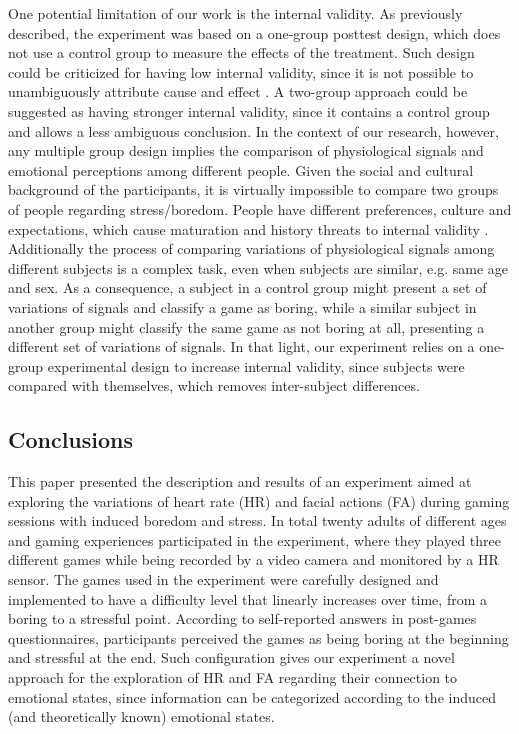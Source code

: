 One potential limitation of our work is the internal validity. As previously described, the experiment was based on a one-group posttest design, which does not use a control group to measure the effects of the treatment. Such design could be criticized for having low internal validity, since it is not possible to unambiguously attribute cause and effect \parencite{kirk1982experimental}. A two-group approach could be suggested as having stronger internal validity, since it contains a control group and allows a less ambiguous conclusion. In the context of our research, however, any multiple group design implies the comparison of physiological signals and emotional perceptions among different people. Given the social and cultural background of the participants, it is virtually impossible to compare two groups of people regarding stress/boredom. People have different preferences, culture and expectations, which cause maturation and history threats to internal validity \parencite{trochim2001research}. Additionally the process of comparing variations of physiological signals among different subjects is a complex task, even when subjects are similar, e.g. same age and sex. As a consequence, a subject in a control group might present a set of variations of signals and classify a game as boring, while a similar subject in another group might classify the same game as not boring at all, presenting a different set of variations of signals. In that light, our experiment relies on a one-group experimental design to increase internal validity, since subjects were compared with themselves, which removes inter-subject differences.

\subsection{Conclusions}

This paper presented the description and results of an experiment aimed at exploring the variations of heart rate (HR) and facial actions (FA) during gaming sessions with induced boredom and stress. In total twenty adults of different ages and gaming experiences participated in the experiment, where they played three different games while being recorded by a video camera and monitored by a HR sensor. The games used in the experiment were carefully designed and implemented to have a difficulty level that linearly increases over time, from a boring to a stressful point. According to self-reported answers in post-games questionnaires, participants perceived the games as being boring at the beginning and stressful at the end. Such configuration gives our experiment a novel approach for the exploration of HR and FA regarding their connection to emotional states, since information can be categorized according to the induced (and theoretically known) emotional states.

